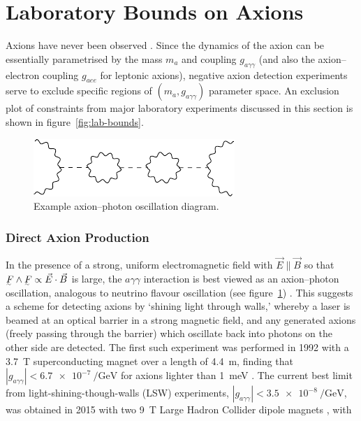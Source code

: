 \section{Laboratory Bounds on Axions}

Axions have never been observed \cite[§\,91]{ParticleDataGroup-review-2020}.
Since the dynamics of the axion can be essentially parametrised by the mass $m_a$ and coupling $g_{aγγ}$ (and also the axion--electron coupling $g_{aee}$ for leptonic axions), negative axion detection experiments serve to exclude specific regions of $(m_a, g_{aγγ})$ parameter space.
An exclusion plot of constraints from major laboratory experiments discussed in this section is shown in figure~\ref{fig:lab-bounds}.

\begin{figure}
	\centering
	\includegraphics{diagrams/axion-photon-oscillation.pdf}
	\caption{Example axion--photon oscillation diagram.}
	\label{fig:axion-photon-oscillation}
\end{figure}


\subsubsection{Direct Axion Production}
In the presence of a strong, uniform electromagnetic field with $\vec E \parallel \vec B$ so that $\ts F\wedge\ts F \propto \vec E \cdot \vec B$ is large, the $aγγ$ interaction is best viewed as an axion--photon oscillation, analogous to neutrino flavour oscillation (see figure~\ref{fig:axion-photon-oscillation}) \cite[§\,91.3.1]{ParticleDataGroup-review-2020}.
This suggests a scheme for detecting axions by `shining light through walls,' whereby a laser is beamed at an optical barrier in a strong magnetic field, and any generated axions (freely passing through the barrier) which oscillate back into photons on the other side are detected.
The first such experiment was performed in 1992 with a \SI{3.7}{\tesla} superconducting magnet over a length of \SI{4.4}{\meter}, finding that $|g_{aγγ}| < \SI{6.7e-7}{\per\giga\eV}$ for axions lighter than \SI{1}{\milli\eV} \cite{first-LSW-experiment}.
The current best limit from light-shining-though-walls (LSW) experiments, $|g_{aγγ}| < \SI{3.5e-8}{\per\giga\eV}$, was obtained in 2015 with two \SI{9}{\tesla} Large Hadron Collider dipole magnets \cite{best-LSW-experiment}, with 


